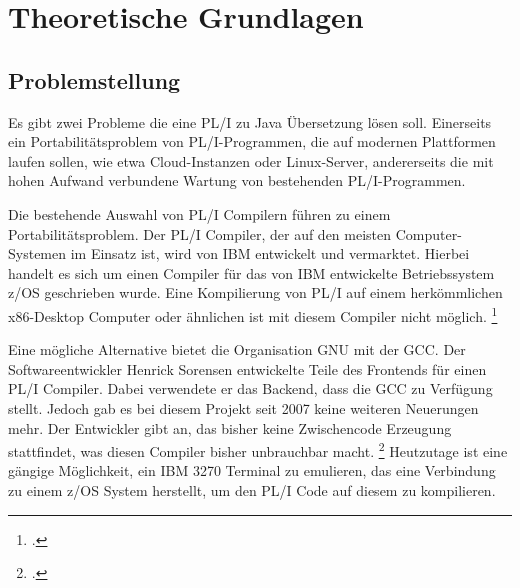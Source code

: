 




\section{Theoretische Grundlagen}
\subsection{Problemstellung}
	
Es gibt zwei Probleme die eine PL/I zu Java Übersetzung lösen soll. 
Einerseits ein Portabilitätsproblem von PL/I-Programmen, die auf modernen Plattformen laufen sollen, wie etwa Cloud-Instanzen oder Linux-Server, andererseits die mit hohen Aufwand verbundene Wartung von bestehenden PL/I-Programmen. 
	
Die bestehende Auswahl von PL/I Compilern führen zu einem Portabilitätsproblem. Der PL/I Compiler, der auf den meisten Computer-Systemen im Einsatz ist, wird von IBM entwickelt und vermarktet. Hierbei handelt es sich um einen Compiler für das von IBM entwickelte Betriebssystem z/OS geschrieben wurde. Eine Kompilierung von PL/I auf einem herkömmlichen x86-Desktop Computer oder ähnlichen ist mit diesem Compiler nicht möglich. \footcite[Vgl. ][]{plicomp}


Eine mögliche Alternative bietet die Organisation GNU mit der \ac{GCC}. Der Softwareentwickler Henrick Sorensen entwickelte Teile des Frontends für einen PL/I Compiler. Dabei verwendete er das Backend, dass die \ac{GCC} zu Verfügung stellt. Jedoch gab es bei diesem Projekt seit 2007 keine weiteren Neuerungen mehr. Der Entwickler gibt an, das bisher keine Zwischencode Erzeugung stattfindet, was diesen Compiler bisher unbrauchbar macht. \footcite[Vgl. ][]{pligcc} 
Heutzutage ist eine gängige Möglichkeit, ein IBM 3270 Terminal zu emulieren, das eine Verbindung zu einem z/OS System herstellt, um den PL/I Code auf diesem zu kompilieren.


